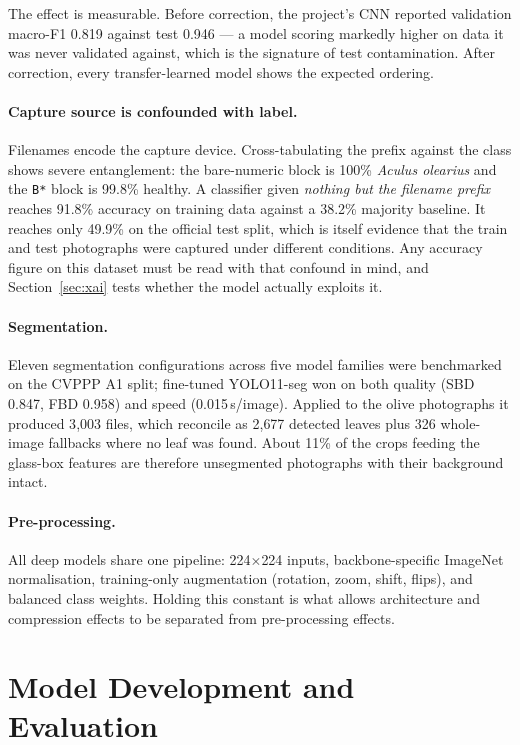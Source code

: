 \documentclass[sigconf,nonacm]{acmart}
\begin{document}
The effect is measurable. Before correction, the project's CNN reported
validation macro-F1 0.819 against test 0.946 --- a model scoring markedly higher
on data it was never validated against, which is the signature of test
contamination. After correction, every transfer-learned model shows the expected
ordering.

\paragraph{Capture source is confounded with label.}
Filenames encode the capture device. Cross-tabulating the prefix against the
class shows severe entanglement: the bare-numeric block is 100\%
\emph{Aculus olearius} and the \texttt{B*} block is 99.8\% healthy. A classifier
given \emph{nothing but the filename prefix} reaches 91.8\% accuracy on training
data against a 38.2\% majority baseline. It reaches only 49.9\% on the official
test split, which is itself evidence that the train and test photographs were
captured under different conditions. Any accuracy figure on this dataset must be
read with that confound in mind, and Section~\ref{sec:xai} tests whether the
model actually exploits it.

\paragraph{Segmentation.}
Eleven segmentation configurations across five model families were benchmarked on
the CVPPP A1 split; fine-tuned YOLO11-seg won on both quality (SBD 0.847, FBD
0.958) and speed (0.015\,s/image). Applied to the olive photographs it produced
3{,}003 files, which reconcile as 2{,}677 detected leaves plus 326 whole-image
fallbacks where no leaf was found. About 11\% of the crops feeding the glass-box
features are therefore unsegmented photographs with their background intact.

\paragraph{Pre-processing.}
All deep models share one pipeline: 224$\times$224 inputs, backbone-specific
ImageNet normalisation, training-only augmentation (rotation, zoom, shift,
flips), and balanced class weights. Holding this constant is what allows
architecture and compression effects to be separated from pre-processing effects.

\section{Model Development and Evaluation}
\end{document}
